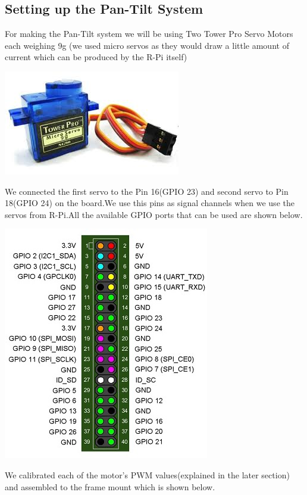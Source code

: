 \documentclass[a4paper,12pt,oneside]{book}
\begin{document}
		\subsection{Setting up the Pan-Tilt System}
		For making the Pan-Tilt system we will be using Two Tower Pro Servo Motors each weighing 9g (we used micro servos as they would draw a little amount of current which can be produced by the R-Pi itself)
		  \begin{center}
		   \includegraphics[scale=0.5]{servo.jpg}
		\end{center}
		\par We connected the first servo to the Pin 16(GPIO 23) and second servo to Pin 18(GPIO 24) on the board.We use this pins as signal channels when we use the servos from R-Pi.All the available GPIO ports that can be used are shown below.
		 \begin{center}
		   \includegraphics[scale=0.6]{gpio.jpg}
		\end{center}
		\par We calibrated each of the motor's PWM values(explained in the later section) and assembled to the frame mount which is shown below.
\end{document}
